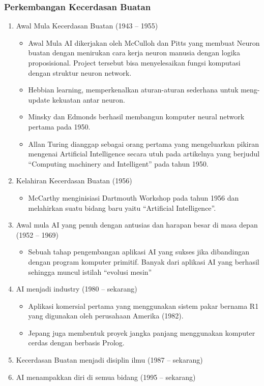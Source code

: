 \subsubsection{Perkembangan Kecerdasan Buatan}
\begin{enumerate}
    \item Awal Mula Kecerdasan Buatan (1943 – 1955)
    \begin{itemize}
        \item Awal Mula AI dikerjakan oleh McCulloh dan Pitts yang membuat Neuron buatan dengan menirukan cara kerja neuron manusia dengan logika proposisional. Project tersebut bisa menyelesaikan fungsi komputasi dengan struktur neuron network.
        \item Hebbian learning, memperkenalkan aturan-aturan sederhana untuk meng-update kekuatan antar neuron.
        \item Minsky dan Edmonds berhasil membangun komputer neural network pertama pada 1950.
        \item Allan Turing dianggap sebagai orang pertama yang mengeluarkan pikiran mengenai Artificial Intelligence secara utuh pada artikelnya yang berjudul “Computing machinery and Intelligent” pada tahun 1950.
    \end{itemize}
    \item Kelahiran Kecerdasan Buatan (1956)
    \begin{itemize}
        \item McCarthy menginisiasi Dartmouth Workshop pada tahun 1956 dan melahirkan suatu bidang baru yaitu “Artificial Intelligence”.
    \end{itemize}
    \item Awal mula AI yang penuh dengan antusias dan harapan besar di masa depan (1952 – 1969)
    \begin{itemize}
        \item Sebuah tahap pengembangan aplikasi AI yang sukses jika dibandingan dengan program komputer primitif. Banyak dari aplikasi AI yang berhasil sehingga muncul istilah “evolusi mesin”
    \end{itemize}
    \item AI menjadi industry (1980 – sekarang)
    \begin{itemize}
        \item Aplikasi komersial pertama yang menggunakan sistem pakar bernama R1 yang digunakan oleh perusahaan Amerika (1982).
        \item Jepang juga membentuk proyek jangka panjang menggunakan komputer cerdas dengan berbasis Prolog.
    \end{itemize}
    \item Kecerdasan Buatan menjadi disiplin ilmu (1987 – sekarang)
    \item AI menampakkan diri di semua bidang (1995 – sekarang)
\end{enumerate}
